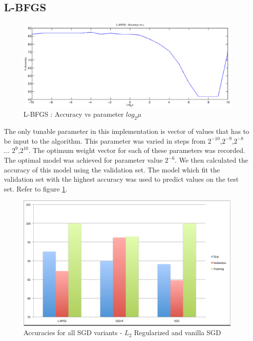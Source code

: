 \documentclass{acm_proc_article-sp}
\begin{document}
\subsection{L-BFGS}
\begin{figure}\label{LBFGS_Graph}
\centering
\includegraphics[scale=0.4]{LBFGS_Graph.eps}
\caption{L-BFGS : Accuracy vs parameter $log_2{\mu}$}
\end{figure}

The only tunable parameter in this implementation is vector of values that has to be input to the algorithm. This parameter was varied in steps from $2^{-10}$,$2^{-9}$,$2^{-8}$ ... $2^{9}$,$2^{10}$. The optimum weight vector for each of these parameters was recorded. The optimal model was achieved for parameter value $2^{-6}$. We then calculated the accuracy of this model using the validation set. The model which fit the validation set with the highest accuracy was used to predict values on the test set. Refer to figure \ref{LBFGS_Graph}.

\begin{figure}\label{All_accuracies_in_one}
\centering
\includegraphics[scale=0.25]{All_accuracies_in_one.eps}
\caption{Accuracies for all SGD variants - $L_{2}$ Regularized and vanilla SGD}
\end{figure}
\bigskip
\end{document}
